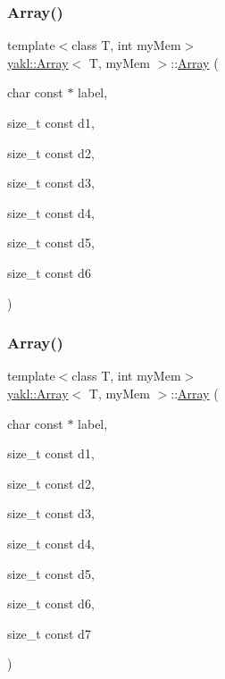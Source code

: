 \subsubsection{\texorpdfstring{Array()}{Array()}\hspace{0.1cm}{\footnotesize\ttfamily [8/12]}}
{\footnotesize\ttfamily template$<$class T, int my\+Mem$>$ \\
\hyperlink{classyakl_1_1Array}{yakl\+::\+Array}$<$ T, my\+Mem $>$\+::\hyperlink{classyakl_1_1Array}{Array} (\begin{DoxyParamCaption}\item[{char const $\ast$}]{label,  }\item[{size\+\_\+t const}]{d1,  }\item[{size\+\_\+t const}]{d2,  }\item[{size\+\_\+t const}]{d3,  }\item[{size\+\_\+t const}]{d4,  }\item[{size\+\_\+t const}]{d5,  }\item[{size\+\_\+t const}]{d6 }\end{DoxyParamCaption})\hspace{0.3cm}{\ttfamily [inline]}}

\mbox{\label{classyakl_1_1Array_aa442acadeba5bbaac00a2377f42d8d90}} 
\subsubsection{\texorpdfstring{Array()}{Array()}\hspace{0.1cm}{\footnotesize\ttfamily [9/12]}}
{\footnotesize\ttfamily template$<$class T, int my\+Mem$>$ \\
\hyperlink{classyakl_1_1Array}{yakl\+::\+Array}$<$ T, my\+Mem $>$\+::\hyperlink{classyakl_1_1Array}{Array} (\begin{DoxyParamCaption}\item[{char const $\ast$}]{label,  }\item[{size\+\_\+t const}]{d1,  }\item[{size\+\_\+t const}]{d2,  }\item[{size\+\_\+t const}]{d3,  }\item[{size\+\_\+t const}]{d4,  }\item[{size\+\_\+t const}]{d5,  }\item[{size\+\_\+t const}]{d6,  }\item[{size\+\_\+t const}]{d7 }\end{DoxyParamCaption})\hspace{0.3cm}{\ttfamily [inline]}}

